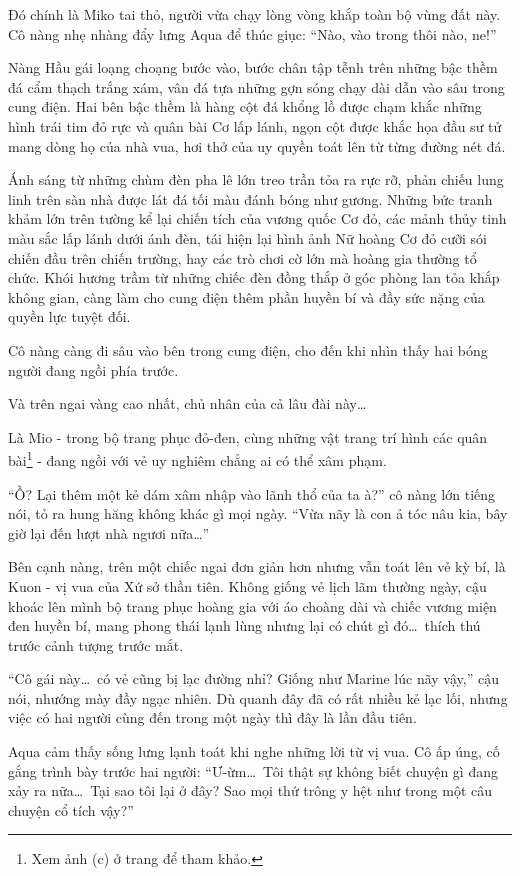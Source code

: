 \documentclass[../main.tex]{subfiles}
\begin{document}
Đó chính là Miko tai thỏ, người vừa chạy lòng vòng khắp toàn bộ vùng đất này. Cô nàng nhẹ nhàng đẩy lưng Aqua để thúc giục: ``Nào, vào trong thôi nào, ne!''

Nàng Hầu gái loạng choạng bước vào, bước chân tập tễnh trên những bậc thềm đá cẩm thạch trắng xám, vân đá tựa những gợn sóng chạy dài dẫn vào sâu trong cung điện. Hai bên bậc thềm là hàng cột đá khổng lồ được chạm khắc những hình trái tim đỏ rực và quân bài Cơ lấp lánh, ngọn cột được khắc họa đầu sư tử mang dòng họ của nhà vua, hơi thở của uy quyền toát lên từ từng đường nét đá.

Ánh sáng từ những chùm đèn pha lê lớn treo trần tỏa ra rực rỡ, phản chiếu lung linh trên sàn nhà được lát đá tối màu đánh bóng như gương. Những bức tranh khảm lớn trên tường kể lại chiến tích của vương quốc Cơ đỏ, các mảnh thủy tinh màu sắc lấp lánh dưới ánh đèn, tái hiện lại hình ảnh Nữ hoàng Cơ đỏ cưỡi sói chiến đầu trên chiến trường, hay các trò chơi cờ lớn mà hoàng gia thường tổ chức. Khói hương trầm từ những chiếc đèn đồng thắp ở góc phòng lan tỏa khắp không gian, càng làm cho cung điện thêm phần huyền bí và đầy sức nặng của quyền lực tuyệt đối.

Cô nàng càng đi sâu vào bên trong cung điện, cho đến khi nhìn thấy hai bóng người đang ngồi phía trước.

Và trên ngai vàng cao nhất, chủ nhân của cả lâu đài này\dots

Là Mio - trong bộ trang phục đỏ-đen, cùng những vật trang trí hình các quân bài\footnote{Xem ảnh (c) ở trang \pageref{wonderland} để tham khảo.} - đang ngồi với vẻ uy nghiêm chẳng ai có thể xâm phạm.

``Ồ? Lại thêm một kẻ dám xâm nhập vào lãnh thổ của ta à?'' cô nàng lớn tiếng nói, tỏ ra hung hăng không khác gì mọi ngày. ``Vừa nãy là con ả tóc nâu kia, bây giờ lại đến lượt nhà ngươi nữa\dots''

Bên cạnh nàng, trên một chiếc ngai đơn giản hơn nhưng vẫn toát lên vẻ kỳ bí, là Kuon - vị vua của Xứ sở thần tiên. Không giống vẻ lịch lãm thường ngày, cậu khoác lên mình bộ trang phục hoàng gia với áo choàng dài và chiếc vương miện đen huyền bí, mang phong thái lạnh lùng nhưng lại có chút gì đó\dots\ thích thú trước cảnh tượng trước mắt.

``Cô gái này\dots\ có vẻ cũng bị lạc đường nhỉ? Giống như Marine lúc nãy vậy,'' cậu nói, nhướng mày đầy ngạc nhiên. Dù quanh đây đã có rất nhiều kẻ lạc lối, nhưng việc có hai người cùng đến trong một ngày thì đây là lần đầu tiên.

Aqua cảm thấy sống lưng lạnh toát khi nghe những lời từ vị vua. Cô ấp úng, cố gắng trình bày trước hai người: ``Ư-ừm\dots\ Tôi thật sự không biết chuyện gì đang xảy ra nữa\dots\ Tại sao tôi lại ở đây? Sao mọi thứ trông y hệt như trong một câu chuyện cổ tích vậy?''
\end{document}
